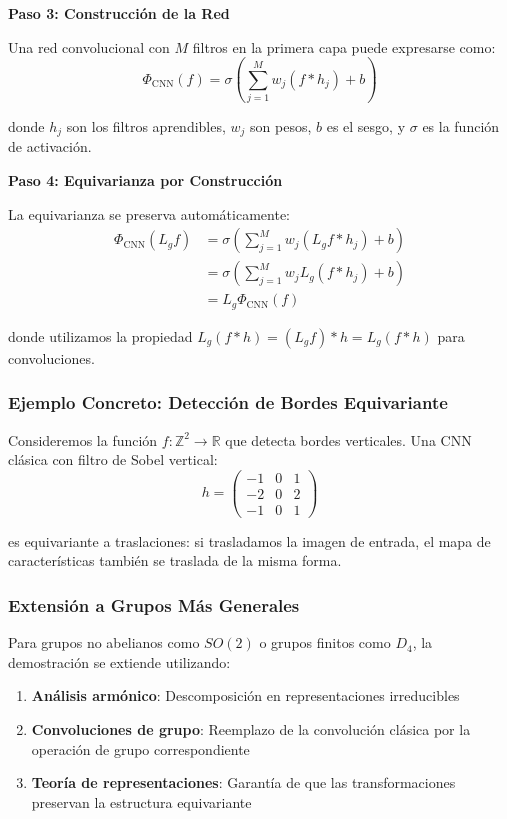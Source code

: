 \textbf{Paso 3: Construcción de la Red}

Una red convolucional con $M$ filtros en la primera capa puede expresarse como:
\begin{equation}
    \Phi_{\text{CNN}}(f) = \sigma\left(\sum_{j=1}^M w_j (f * h_j) + b\right)
\end{equation}

donde $h_j$ son los filtros aprendibles, $w_j$ son pesos, $b$ es el sesgo, y $\sigma$ es la función de activación.

\textbf{Paso 4: Equivarianza por Construcción}

La equivarianza se preserva automáticamente:
\begin{align}
    \Phi_{\text{CNN}}(L_g f) &= \sigma\left(\sum_{j=1}^M w_j (L_g f * h_j) + b\right) \\
    &= \sigma\left(\sum_{j=1}^M w_j L_g(f * h_j) + b\right) \\
    &= L_g \Phi_{\text{CNN}}(f)
\end{align}

donde utilizamos la propiedad $L_g(f * h) = (L_g f) * h = L_g(f * h)$ para convoluciones.

\subsubsection{Ejemplo Concreto: Detección de Bordes Equivariante}

Consideremos la función $f: \mathbb{Z}^2 \to \mathbb{R}$ que detecta bordes verticales. Una CNN clásica con filtro de Sobel vertical:
\begin{equation}
    h = \begin{pmatrix} -1 & 0 & 1 \\ -2 & 0 & 2 \\ -1 & 0 & 1 \end{pmatrix}
\end{equation}

es equivariante a traslaciones: si trasladamos la imagen de entrada, el mapa de características también se traslada de la misma forma.

\subsubsection{Extensión a Grupos Más Generales}

Para grupos no abelianos como $SO(2)$ o grupos finitos como $D_4$, la demostración se extiende utilizando:

\begin{enumerate}
    \item \textbf{Análisis armónico}: Descomposición en representaciones irreducibles
    \item \textbf{Convoluciones de grupo}: Reemplazo de la convolución clásica por la operación de grupo correspondiente
    \item \textbf{Teoría de representaciones}: Garantía de que las transformaciones preservan la estructura equivariante
\end{enumerate}

